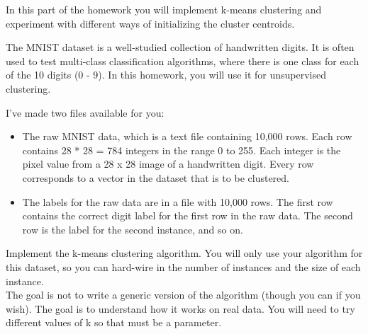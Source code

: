 \documentclass[paper=a4, fontsize=11pt]{scrartcl} %
\numberwithin{equation}{section} %
\numberwithin{figure}{section} %
\numberwithin{table}{section} %
\begin{document}
In this part of the homework you will implement k-means clustering and experiment with different ways of initializing the cluster centroids.

The MNIST dataset is a well-studied collection of handwritten digits. It is often used to test multi-class classification algorithms, where there is one class for each of the 10 digits (0 - 9). In this homework, you will use it for unsupervised clustering.

I've made two files available for you: 
\begin{itemize}


  \item  The raw MNIST data, which is a text file containing 10,000 rows. Each row contains 28 * 28 = 784 integers in the range 0 to 255. Each integer is the pixel value from a 28 x 28 image of a handwritten digit. Every row corresponds to a vector in the dataset that is to be clustered.
  \item  The labels for the raw data are in a file with 10,000 rows. The first row contains the correct digit label for the first row in the raw data. The second row is the label for the second instance, and so on. 

\end{itemize}

 Implement the k-means clustering algorithm. You will only use your algorithm for this dataset, so you can hard-wire in the number of instances and the size of each instance.\\
 The goal is not to write a generic version of the algorithm (though you can if you wish). The goal is to understand how it works on real data. You will need to try different values of k so that must be a parameter.
\end{document}
